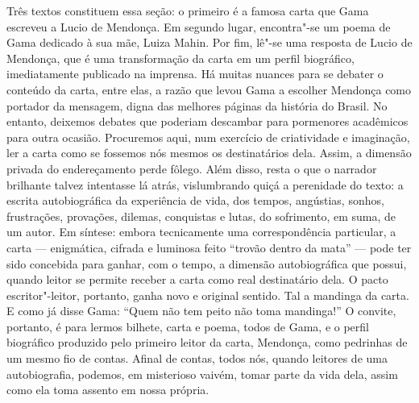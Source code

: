 \mbox{}\vfill
\thispagestyle{empty}
{\small\noindent
Três textos constituem essa seção: o primeiro é a famosa carta que Gama
escreveu a Lucio de Mendonça. Em segundo lugar, encontra"-se um poema de
Gama dedicado à sua mãe, Luiza Mahin. Por fim, lê"-se uma resposta de
Lucio de Mendonça, que é uma transformação da carta em um perfil
biográfico, imediatamente publicado na imprensa. Há muitas nuances para
se debater o conteúdo da carta, entre elas, a razão que levou Gama a
escolher Mendonça como portador da mensagem, digna das melhores páginas
da história do Brasil. No entanto, deixemos debates que poderiam
descambar para pormenores acadêmicos para outra ocasião. Procuremos
aqui, num exercício de criatividade e imaginação, ler a carta como se
fossemos nós mesmos os destinatários dela. Assim, a dimensão privada do
endereçamento perde fôlego. Além disso, resta o que o narrador brilhante
talvez intentasse lá atrás, vislumbrando quiçá a perenidade do texto: a
escrita autobiográfica da experiência de vida, dos tempos, angústias,
sonhos, frustrações, provações, dilemas, conquistas e lutas, do
sofrimento, em suma, de um autor. Em síntese: embora tecnicamente uma
correspondência particular, a carta --- enigmática, cifrada e luminosa
feito ``trovão dentro da mata'' --- pode ter sido concebida para ganhar,
com o tempo, a dimensão autobiográfica que possui, quando leitor se
permite receber a carta como real destinatário dela. O pacto
escritor"-leitor, portanto, ganha novo e original sentido. Tal a mandinga
da carta. E como já disse Gama: ``Quem não tem peito não toma mandinga!''
O convite, portanto, é para lermos bilhete, carta e poema, todos de
Gama, e o perfil biográfico produzido pelo primeiro leitor da carta,
Mendonça, como pedrinhas de um mesmo fio de contas. Afinal de contas,
todos nós, quando leitores de uma autobiografia, podemos, em misterioso
vaivém, tomar parte da vida dela, assim como ela toma assento em nossa
própria.}

\@openrighttrue\makeatother \endgroup

\pagebreak
\movetooddpage


%
%
%
%
%
%
%

\pagebreak
\paginabranca
\mbox{}\vfill
\thispagestyle{empty}

